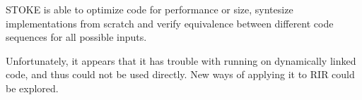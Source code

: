 STOKE is able to optimize code for performance or size, syntesize implementations from scratch and verify equivalence between different code sequences for all possible inputs.

Unfortunately, it appears that it has trouble with running on dynamically linked code, and thus could not be used directly. New ways of applying it to RIR could be explored.
